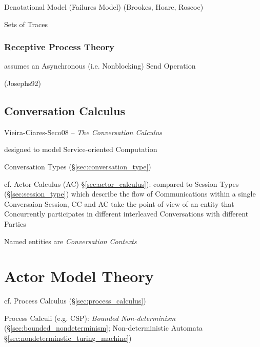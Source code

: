 Denotational Model (Failures Model) (Brookes, Hoare, Roscoe)

Sets of Traces



\subsubsection{Receptive Process Theory}\label{sec:receptive_process}

assumes an Asynchronous (i.e. Nonblocking) Send Operation

(Josephs92)



\subsection{Conversation Calculus}\label{sec:conversation_calculus}

Vieira-Ciares-Seco08 -- \emph{The Conversation Calculus}

designed to model Service-oriented Computation

\fist Conversation Types (\S\ref{sec:conversation_type})

\fist cf. Actor Calculus (AC) \S\ref{sec:actor_calculus}): compared to
Session Types (\S\ref{sec:session_type}) which describe the flow of
Communications within a single Conversaion Session, CC and AC take the
point of view of an entity that Concurrently participates in different
interleaved Conversations with different Parties

Named entities are \emph{Conversation Contexts}



\section{Actor Model Theory}\label{sec:actor_model}

\begingroup

\newcommand{\actord}{\xrightarrow{\approx}}
\newcommand{\arrord}[1]{\xrightarrow{#1}}
\newcommand{\cmbord}{\rightarrow}

\fist cf. Process Calculus (\S\ref{sec:process_calculus})

Process Calculi (e.g. CSP): \emph{Bounded Non-determinism}
(\S\ref{sec:bounded_nondeterminism}; \fist Non-deterministic Automata
\S\ref{sec:nondeterminstic_turing_machine})

